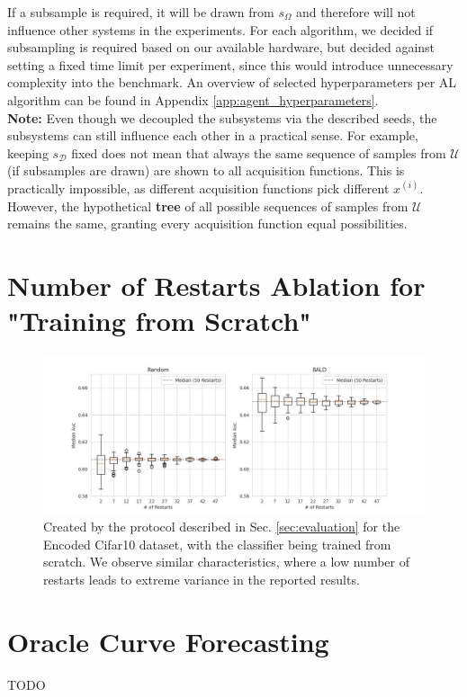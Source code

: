 \documentclass[]{article}
\begin{document}
If a subsample is required, it will be drawn from $s_\Omega$ and therefore will not influence other systems in the experiments.
For each algorithm, we decided if subsampling is required based on our available hardware, but decided against setting a fixed time limit per experiment, since this would introduce unnecessary complexity into the benchmark.
An overview of selected hyperparameters per AL algorithm can be found in Appendix \ref{app:agent_hyperparameters}. \\
\textbf{Note:} Even though we decoupled the subsystems via the described seeds, the subsystems can still influence each other in a practical sense. 
For example, keeping $s_\mathcal{D}$ fixed does not mean that always the same sequence of samples from $\mathcal{U}$ (if subsamples are drawn) are shown to all acquisition functions. 
This is practically impossible, as different acquisition functions pick different $x^{(i)}$.
However, the hypothetical \textbf{tree} of all possible sequences of samples from $\mathcal{U}$ remains the same, granting every acquisition function equal possibilities.


\section{Number of Restarts Ablation for "Training from Scratch"}\label{app:restarts_from_scratch}
\begin{figure}[H]
    \centering
    \includegraphics[width=\linewidth]{img/ablation_cifar_restarts}
    \caption{Created by the protocol described in Sec. \ref{sec:evaluation} for the Encoded Cifar10 dataset, with the classifier being trained from scratch. We observe similar characteristics, where a low number of restarts leads to extreme variance in the reported results.}
\end{figure}

\section{Oracle Curve Forecasting}\label{app:oracle_forecasting}
TODO
\end{document}
